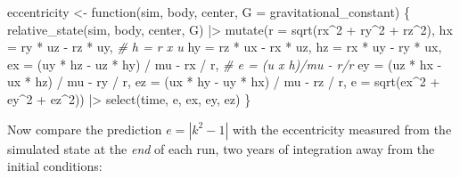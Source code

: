 \documentclass[
  10.5pt,
  letterpaper,
]{scrbook}
\newenvironment{Shaded}{\begin{snugshade}}{\end{snugshade}}
\newcommand{\AttributeTok}[1]{\textcolor[rgb]{0.00,0.00,0.00}{#1}}
\newcommand{\CommentTok}[1]{\textcolor[rgb]{0.00,0.00,0.00}{\textit{#1}}}
\newcommand{\ControlFlowTok}[1]{\textcolor[rgb]{0.00,0.00,0.00}{#1}}
\newcommand{\DecValTok}[1]{\textcolor[rgb]{0.00,0.00,0.00}{#1}}
\newcommand{\FunctionTok}[1]{\textcolor[rgb]{0.00,0.00,0.00}{#1}}
\newcommand{\NormalTok}[1]{\textcolor[rgb]{0.00,0.00,0.00}{#1}}
\newcommand{\OtherTok}[1]{\textcolor[rgb]{0.00,0.00,0.00}{#1}}
\newcommand{\SpecialCharTok}[1]{\textcolor[rgb]{0.00,0.00,0.00}{#1}}
\theoremstyle{plain}
\theoremstyle{remark}
\begin{document}
\begin{Shaded}
\begin{Highlighting}[]
\NormalTok{eccentricity }\OtherTok{\textless{}{-}} \ControlFlowTok{function}\NormalTok{(sim, body, center, }\AttributeTok{G =}\NormalTok{ gravitational\_constant) \{}
  \FunctionTok{relative\_state}\NormalTok{(sim, body, center, G) }\SpecialCharTok{|\textgreater{}}
    \FunctionTok{mutate}\NormalTok{(}\AttributeTok{r  =} \FunctionTok{sqrt}\NormalTok{(rx}\SpecialCharTok{\^{}}\DecValTok{2} \SpecialCharTok{+}\NormalTok{ ry}\SpecialCharTok{\^{}}\DecValTok{2} \SpecialCharTok{+}\NormalTok{ rz}\SpecialCharTok{\^{}}\DecValTok{2}\NormalTok{),}
           \AttributeTok{hx =}\NormalTok{ ry }\SpecialCharTok{*}\NormalTok{ uz }\SpecialCharTok{{-}}\NormalTok{ rz }\SpecialCharTok{*}\NormalTok{ uy,                   }\CommentTok{\# h = r x u}
           \AttributeTok{hy =}\NormalTok{ rz }\SpecialCharTok{*}\NormalTok{ ux }\SpecialCharTok{{-}}\NormalTok{ rx }\SpecialCharTok{*}\NormalTok{ uz,}
           \AttributeTok{hz =}\NormalTok{ rx }\SpecialCharTok{*}\NormalTok{ uy }\SpecialCharTok{{-}}\NormalTok{ ry }\SpecialCharTok{*}\NormalTok{ ux,}
           \AttributeTok{ex =}\NormalTok{ (uy }\SpecialCharTok{*}\NormalTok{ hz }\SpecialCharTok{{-}}\NormalTok{ uz }\SpecialCharTok{*}\NormalTok{ hy) }\SpecialCharTok{/}\NormalTok{ mu }\SpecialCharTok{{-}}\NormalTok{ rx }\SpecialCharTok{/}\NormalTok{ r,  }\CommentTok{\# e = (u x h)/mu {-} r/r}
           \AttributeTok{ey =}\NormalTok{ (uz }\SpecialCharTok{*}\NormalTok{ hx }\SpecialCharTok{{-}}\NormalTok{ ux }\SpecialCharTok{*}\NormalTok{ hz) }\SpecialCharTok{/}\NormalTok{ mu }\SpecialCharTok{{-}}\NormalTok{ ry }\SpecialCharTok{/}\NormalTok{ r,}
           \AttributeTok{ez =}\NormalTok{ (ux }\SpecialCharTok{*}\NormalTok{ hy }\SpecialCharTok{{-}}\NormalTok{ uy }\SpecialCharTok{*}\NormalTok{ hx) }\SpecialCharTok{/}\NormalTok{ mu }\SpecialCharTok{{-}}\NormalTok{ rz }\SpecialCharTok{/}\NormalTok{ r,}
           \AttributeTok{e  =} \FunctionTok{sqrt}\NormalTok{(ex}\SpecialCharTok{\^{}}\DecValTok{2} \SpecialCharTok{+}\NormalTok{ ey}\SpecialCharTok{\^{}}\DecValTok{2} \SpecialCharTok{+}\NormalTok{ ez}\SpecialCharTok{\^{}}\DecValTok{2}\NormalTok{)) }\SpecialCharTok{|\textgreater{}}
    \FunctionTok{select}\NormalTok{(time, e, ex, ey, ez)}
\NormalTok{\}}
\end{Highlighting}
\end{Shaded}

Now compare the prediction \(e = |k^2 - 1|\) with the eccentricity
measured from the simulated state at the \emph{end} of each run, two
years of integration away from the initial conditions:
\end{document}
